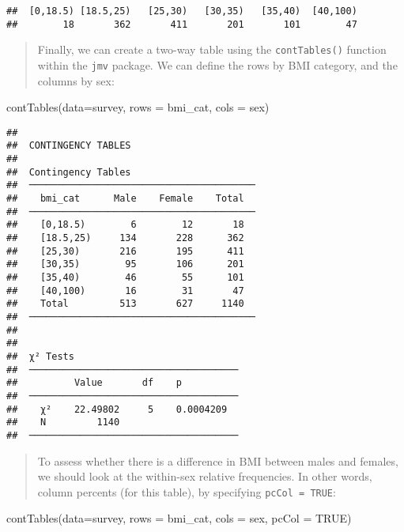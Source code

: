 \documentclass[
]{memoir}
\newenvironment{Shaded}{\begin{snugshade}}{\end{snugshade}}
\newcommand{\AttributeTok}[1]{\textcolor[rgb]{0.77,0.63,0.00}{#1}}
\newcommand{\ConstantTok}[1]{\textcolor[rgb]{0.00,0.00,0.00}{#1}}
\newcommand{\FunctionTok}[1]{\textcolor[rgb]{0.00,0.00,0.00}{#1}}
\newcommand{\NormalTok}[1]{#1}
\begin{document}
\begin{verbatim}
##  [0,18.5) [18.5,25)   [25,30)   [30,35)   [35,40)  [40,100) 
##        18       362       411       201       101        47
\end{verbatim}

\begin{quote}
Finally, we can create a two-way table using the \texttt{contTables()} function within the \texttt{jmv} package. We can define the rows by BMI category, and the columns by sex:
\end{quote}

\begin{Shaded}
\begin{Highlighting}[]
\FunctionTok{contTables}\NormalTok{(}\AttributeTok{data=}\NormalTok{survey,}
           \AttributeTok{rows =}\NormalTok{ bmi\_cat,}
           \AttributeTok{cols =}\NormalTok{ sex)}
\end{Highlighting}
\end{Shaded}

\begin{verbatim}
## 
##  CONTINGENCY TABLES
## 
##  Contingency Tables                       
##  ──────────────────────────────────────── 
##    bmi_cat      Male    Female    Total   
##  ──────────────────────────────────────── 
##    [0,18.5)        6        12       18   
##    [18.5,25)     134       228      362   
##    [25,30)       216       195      411   
##    [30,35)        95       106      201   
##    [35,40)        46        55      101   
##    [40,100)       16        31       47   
##    Total         513       627     1140   
##  ──────────────────────────────────────── 
## 
## 
##  χ² Tests                              
##  ───────────────────────────────────── 
##          Value       df    p           
##  ───────────────────────────────────── 
##    χ²    22.49802     5    0.0004209   
##    N         1140                      
##  ─────────────────────────────────────
\end{verbatim}

\begin{quote}
To assess whether there is a difference in BMI between males and females, we should look at the within-sex relative frequencies. In other words, column percents (for this table), by specifying \texttt{pcCol\ =\ TRUE}:
\end{quote}

\begin{Shaded}
\begin{Highlighting}[]
\FunctionTok{contTables}\NormalTok{(}\AttributeTok{data=}\NormalTok{survey,}
           \AttributeTok{rows =}\NormalTok{ bmi\_cat,}
           \AttributeTok{cols =}\NormalTok{ sex,}
           \AttributeTok{pcCol =} \ConstantTok{TRUE}\NormalTok{)}
\end{Highlighting}
\end{Shaded}
\end{document}

